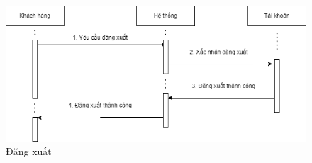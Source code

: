 \begin{figure}[!h]
    \begin{center}
        \includegraphics[scale=0.7]{Images/SequenceDiagram/s_logout.drawio.png}
    \end{center}
    \hspace{0.3cm}
    \caption{Đăng xuất}
\end{figure}